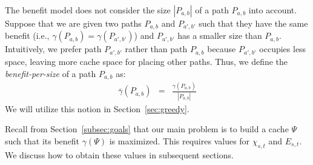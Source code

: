 \documentclass{sig-alternate}
\newcommand{\stitle}[1]{\vspace*{0.4em}\noindent{\bf #1:\/}}
\newcommand{\spath}{SP\xspace}
\begin{document}



\stitle{Benefit per size}
%
The benefit model does not consider the size $|P_{a,b}|$ of a path $P_{a,b}$ into account.
%
Suppose that we are given two paths $P_{a,b}$ and $P_{a',b'}$
such that they have the same benefit (i.e., $\gamma(P_{a,b})=\gamma(P_{a',b'})$)
and $P_{a',b'}$ has a smaller size than $P_{a,b}$.
%
Intuitively, we prefer path $P_{a',b'}$ rather than path $P_{a,b}$
because $P_{a',b'}$ occupies less space, leaving more cache space for placing other paths.
Thus, we define the {\em benefit-per-size} of a path $P_{a,b}$ as:
\begin{eqnarray} \label{eq:benefitPerSize}
\overline{\gamma}(P_{a,b}) & = & \frac{  \gamma(P_{a,b}) }{  |P_{a,b}| }
\end{eqnarray}
We will utilize this notion in Section~\ref{sec:greedy}.







Recall from Section~\ref{subsec:goals} that
our main problem is to build a cache $\Psi$ such that its benefit $\gamma(\Psi)$ is maximized.
This requires values for $\chi_{s,t}$ and $E_{s,t}$.
We discuss how to obtain these values in subsequent sections.











%
%
%
\end{document}
